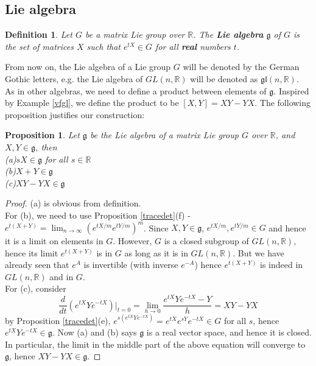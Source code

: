 \documentclass[11pt]{article}
\newtheorem{proposition}[theorem]{Proposition}
\newtheorem{definition}[theorem]{Definition}
\newcommand{\bb}[1]{\mathbb{#1}}
\newcommand{\mf}[1]{\mathfrak{#1}}
\begin{document}
\subsection{Lie algebra}
\begin{definition}
Let $G$ be a matrix Lie group over $\bb{R}$. The \textbf{Lie algebra} $\mf{g}$ of $G$ is the set of matrices $X$ such that $e^{tX} \in G$ for all \textbf{real} numbers $t$.
\end{definition}
From now on, the Lie algebra of a Lie group $G$ will be denoted by the German Gothic letters, e.g. the Lie algebra of $GL(n,\bb{R})$ will be denoted as $\mf{gl}(n,\bb{R})$.\\
As in other algebras, we need to define a product between elements of $\mf{g}$. Inspired by Example \ref{vfgl}, we define the product to be $[X,Y] = XY - YX$. The following proposition justifies our construction:
\begin{proposition}
Let $\mf{g}$ be the Lie algebra of a matrix Lie group $G$ over $\bb{R}$, and $X, Y \in \mf{g}$, then\\
(a)$sX \in \mf{g}$ for all $s \in \bb{R}$\\
(b)$X+Y \in \mf{g}$\\
(c)$XY - YX \in \mf{g}$
\end{proposition}
\begin{proof}
(a) is obvious from definition.\\
For (b), we need to use Proposition \ref{tracedet}(f) - $e^{t(X+Y)} = \lim_{n \to \infty}(e^{tX/m}e^{tY/m})^m$. Since $X, Y \in \mf{g}$, $e^{tX/m}, e^{tY/m} \in G$ and hence it is a limit on elements in $G$. However, $G$ is a closed subgroup of $GL(n,\bb{R})$, hence its limit $e^{t(X+Y)}$ is in $G$ as long as it is in $GL(n,\bb{R})$. But we have already seen that $e^A$ is invertible (with inverse $e^{-A}$) hence $e^{t(X+Y)}$ is indeed in $GL(n,\bb{R})$ and in $G$.\\
For (c), consider
$$\frac{d}{dt}(e^{tX}Ye^{-tX})|_{t = 0} = \lim_{h \to 0} \frac{e^{tX}Ye^{-tX} - Y}{h} = XY - YX$$
by Proposition \ref{tracedet}(e), $e^{s(e^{tX}Ye^{-tX})} = e^{tX}e^{sY}e^{-tX} \in G$ for all $s$, hence $e^{tX}Ye^{-tX} \in \mf{g}$. Now (a) and (b) says $\mf{g}$ is a real vector space, and hence it is closed. In particular, the limit in the middle part of the above equation will converge to $\mf{g}$, hence $XY - YX \in \mf{g}$.
\end{proof}
\end{document}
